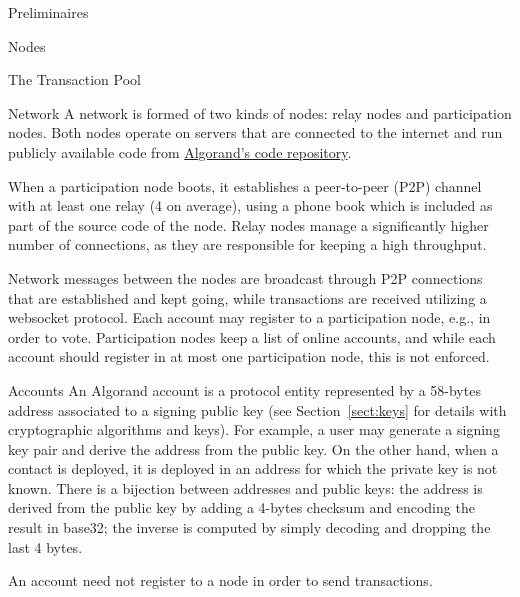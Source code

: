 \documentclass[10pt,a4paper]{article}
\begin{document}
\begin{section}{Preliminaires}
\begin{subsection}{Nodes}
\begin{subsubsection}{The Transaction Pool}
\end{subsubsection}

\end{subsection}    
\begin{subsection}{Network}\label{sect:network}
A network is formed of two kinds of nodes: {\sf relay nodes}
and {\sf participation nodes}. 
Both nodes operate on servers that are connected to the internet and run publicly
available code from \href{https://github.com/algorand/go-algorand}{Algorand's code repository}.

When a participation node boots, it establishes a peer-to-peer (P2P) 
channel with at least one relay (4 on average), using a phone book which is included
as part of the source code of the node. 
Relay nodes manage a significantly higher number of connections, as they 
are responsible for keeping a high throughput.

Network messages between the nodes are broadcast through P2P connections that are
established and kept going, while transactions are received utilizing a websocket 
protocol.
Each account may register to a participation node, e.g., in order to vote.
Participation nodes keep a list of online accounts, and while each account should
register in at most one participation node, this is not enforced.

\end{subsection}
\begin{subsection}{Accounts}\label{sect:accounts}
An Algorand account is a protocol entity represented by a 58-bytes address
associated to a signing public key (see Section~\ref{sect:keys} for
details with cryptographic algorithms and keys).
For example, a user may generate a signing key pair and derive the address
from the public key. On the other hand, when a contact is deployed, it is
deployed in an address for which the private key is not known.
There is a bijection between addresses and public keys: the address is 
derived from the public key by adding a 4-bytes checksum and encoding the result
in base32; the inverse is computed by simply decoding and dropping the last 4 
bytes.

An account need not register to a node in order to send transactions.


\end{subsection}
\end{section}
\end{document}
